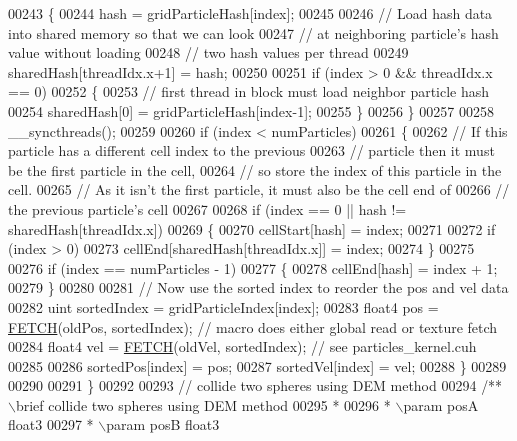 \begin{DoxyCode}
00243     \{
00244         hash = gridParticleHash[index];
00245 
00246         \textcolor{comment}{// Load hash data into shared memory so that we can look}
00247         \textcolor{comment}{// at neighboring particle's hash value without loading}
00248         \textcolor{comment}{// two hash values per thread}
00249         sharedHash[threadIdx.x+1] = hash;
00250 
00251         \textcolor{keywordflow}{if} (index > 0 && threadIdx.x == 0)
00252         \{
00253             \textcolor{comment}{// first thread in block must load neighbor particle hash}
00254             sharedHash[0] = gridParticleHash[index-1];
00255         \}
00256     \}
00257 
00258     \_\_syncthreads();
00259 
00260     \textcolor{keywordflow}{if} (index < numParticles)
00261     \{
00262         \textcolor{comment}{// If this particle has a different cell index to the previous}
00263         \textcolor{comment}{// particle then it must be the first particle in the cell,}
00264         \textcolor{comment}{// so store the index of this particle in the cell.}
00265         \textcolor{comment}{// As it isn't the first particle, it must also be the cell end of}
00266         \textcolor{comment}{// the previous particle's cell}
00267 
00268         \textcolor{keywordflow}{if} (index == 0 || hash != sharedHash[threadIdx.x])
00269         \{
00270             cellStart[hash] = index;
00271 
00272             \textcolor{keywordflow}{if} (index > 0)
00273                 cellEnd[sharedHash[threadIdx.x]] = index;
00274         \}
00275 
00276         \textcolor{keywordflow}{if} (index == numParticles - 1)
00277         \{
00278             cellEnd[hash] = index + 1;
00279         \}
00280 
00281         \textcolor{comment}{// Now use the sorted index to reorder the pos and vel data}
00282         uint sortedIndex = gridParticleIndex[index];
00283         float4 pos = \hyperlink{particles__kernel_8cuh_a12269d678a65f18889c2a7e98c756457}{FETCH}(oldPos, sortedIndex);       \textcolor{comment}{// macro does either global read or
       texture fetch}
00284         float4 vel = \hyperlink{particles__kernel_8cuh_a12269d678a65f18889c2a7e98c756457}{FETCH}(oldVel, sortedIndex);       \textcolor{comment}{// see particles\_kernel.cuh}
00285 
00286         sortedPos[index] = pos;
00287         sortedVel[index] = vel;
00288     \}
00289 
00290 
00291 \}
00292 
00293 \textcolor{comment}{// collide two spheres using DEM method}
00294 \textcolor{comment}{/** \(\backslash\)brief collide two spheres using DEM method}
00295 \textcolor{comment}{ *}
00296 \textcolor{comment}{ * \(\backslash\)param posA float3}
00297 \textcolor{comment}{ * \(\backslash\)param posB float3}

\end{DoxyCode}
